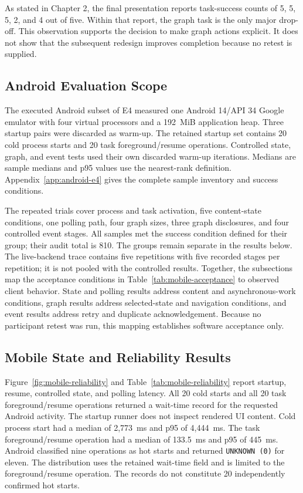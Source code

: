 As stated in Chapter 2, the final presentation reports task-success counts of 5, 5, 5, 2, and 4 out of five.
Within that report, the graph task is the only major drop-off.
This observation supports the decision to make graph actions explicit.
It does not show that the subsequent redesign improves completion because no retest is supplied.

\subsection{Android Evaluation Scope}
\label{sec:e4-android}

The executed Android subset of E4 measured one Android 14/API 34 Google emulator with four virtual processors and a 192~MiB application heap.
Three startup pairs were discarded as warm-up.
The retained startup set contains 20 cold process starts and 20 task foreground/resume operations.
Controlled state, graph, and event tests used their own discarded warm-up iterations.
Medians are sample medians and p95 values use the nearest-rank definition.
Appendix~\ref{app:android-e4} gives the complete sample inventory and success conditions.

The repeated trials cover process and task activation, five content-state conditions, one polling path, four graph sizes, three graph disclosures, and four controlled event stages.
All samples met the success condition defined for their group; their audit total is 810.
The groups remain separate in the results below.
The live-backend trace contains five repetitions with five recorded stages per repetition; it is not pooled with the controlled results.
Together, the subsections map the acceptance conditions in Table~\ref{tab:mobile-acceptance} to observed client behavior.
State and polling results address content and asynchronous-work conditions, graph results address selected-state and navigation conditions, and event results address retry and duplicate acknowledgement.
Because no participant retest was run, this mapping establishes software acceptance only.

\subsection{Mobile State and Reliability Results}

Figure~\ref{fig:mobile-reliability} and Table~\ref{tab:mobile-reliability} report startup, resume, controlled state, and polling latency.
All 20 cold starts and all 20 task foreground/resume operations returned a wait-time record for the requested Android activity.
The startup runner does not inspect rendered UI content.
Cold process start had a median of 2,773~ms and p95 of 4,444~ms.
The task foreground/resume operation had a median of 133.5~ms and p95 of 445~ms.
Android classified nine operations as hot starts and returned \texttt{UNKNOWN (0)} for eleven.
The distribution uses the retained wait-time field and is limited to the foreground/resume operation.
The records do not constitute 20 independently confirmed hot starts.


